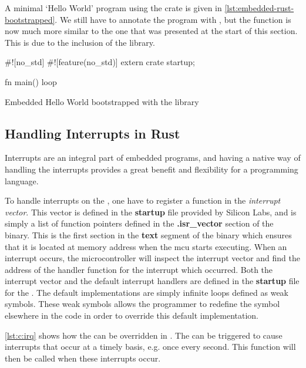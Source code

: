 A minimal `Hello World' program using the  crate is given in \autoref{lst:embedded-rust-bootstrapped}.
We still have to annotate the program with \code{\#[no\_std]}, but the  function is now much more similar to the one that was presented at the start of this section.
This is due to the inclusion of the  library.

\begin{listing}[H]
  \begin{rustcode}
#![no_std]
#![feature(no_std)]
extern crate startup;

fn main() {
  loop {}
}
  \end{rustcode}
  \label{lst:embedded-rust-bootstrapped}
  \caption{Embedded Hello World bootstrapped with the  library}
\end{listing}

\subsection{Handling Interrupts in Rust}
\label{sec:impl:handling-interrupts}

Interrupts are an integral part of embedded programs, and having a native way of handling the interrupts provides a great benefit and flexibility for a programming language.

To handle interrupts on the {\gecko}, one have to register a function in the \emph{interrupt vector}.
This vector is defined in the \textbf{startup} file provided by Silicon Labs, and is simply a list of function pointers defined in the \textbf{.isr\_vector} section of the {\elf} binary.
This is the first section in the \textbf{text} segment of the binary which ensures that it is located at memory address  when the \gls{mcu} starts executing.
When an interrupt occurs, the microcontroller will inspect the interrupt vector and find the address of the handler function for the interrupt which occurred.
Both the interrupt vector and the default interrupt handlers are defined in the \textbf{startup} file for the {\gecko}.
The default implementations are simply infinite loops defined as weak symbols.
These weak symbols allows the programmer to redefine the symbol elsewhere in the code in order to override this default implementation.

\autoref{lst:c:irq} shows how the  can be overridden in {\C}.
The {\gecko} can be triggered to cause interrupts that occur at a timely basis, e.g. once every second.
This function will then be called when these interrupts occur.


